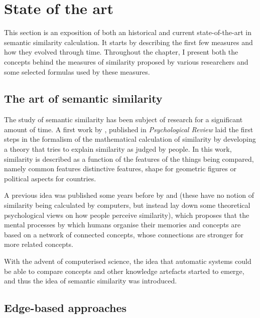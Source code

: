 \chapter{State of the art} \label{chap:sota}

This section is an exposition of both an historical and current state-of-the-art in semantic similarity calculation. It starts by describing the first few measures and how they evolved through time. Throughout the chapter, I present both the concepts behind the measures of similarity proposed by various researchers and some selected formulas used by these measures.


\section{The art of semantic similarity} \label{sec:sota/art}

The study of semantic similarity has been subject of research for a significant amount of time. A first work by \citet{Tversky1977}, published in \emph{Psychological Review} laid the first steps in the formalism of the mathematical calculation of similarity by developing a theory that tries to explain similarity as judged by people. In this work, similarity is described as a function of the features of the things being compared, namely common features \vs distinctive features, \eg shape for geometric figures or political aspects for countries.

A previous idea was published some years before by \citet{Quillian1968} and \citet{Collins1975} (these have no notion of similarity being calculated by computers, but instead lay down some theoretical psychological views on how people perceive similarity), which proposes that the mental processes by which humans organise their memories and concepts are based on a network of connected concepts, whose connections are stronger for more related concepts.

With the advent of computerised science, the idea that automatic systems could be able to compare concepts and other knowledge artefacts started to emerge, and thus the idea of semantic similarity was introduced.


\section{Edge-based approaches} \label{sec:sota/edge}

